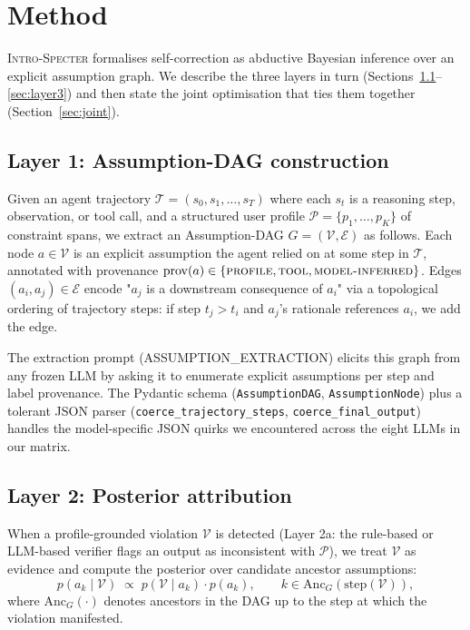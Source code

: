 \section{Method}
\label{sec:method}

\textsc{Intro-Specter} formalises self-correction as abductive Bayesian
inference over an explicit assumption graph. We describe the three
layers in turn (Sections~\ref{sec:layer1}--\ref{sec:layer3}) and then
state the joint optimisation that ties them together
(Section~\ref{sec:joint}).

\subsection{Layer 1: Assumption-DAG construction}
\label{sec:layer1}

Given an agent trajectory $\mathcal{T} = (s_0, s_1, \dots, s_T)$ where
each $s_t$ is a reasoning step, observation, or tool call, and a
structured user profile $\mathcal{P} = \{p_1, \dots, p_K\}$ of
constraint spans, we extract an Assumption-DAG
$G = (\mathcal{V}, \mathcal{E})$ as follows. Each node $a \in \mathcal{V}$
is an explicit assumption the agent relied on at some step in
$\mathcal{T}$, annotated with provenance
$\mathrm{prov}(a) \in \{\textsc{profile}, \textsc{tool}, \textsc{model-inferred}\}$.
Edges $(a_i, a_j) \in \mathcal{E}$ encode "$a_j$ is a downstream
consequence of $a_i$" via a topological ordering of trajectory steps:
if step $t_j > t_i$ and $a_j$'s rationale references $a_i$, we add the
edge.

The extraction prompt (\textsc{ASSUMPTION\_EXTRACTION}) elicits this
graph from any frozen LLM by asking it to enumerate explicit
assumptions per step and label provenance. The Pydantic schema
(\texttt{AssumptionDAG}, \texttt{AssumptionNode}) plus a tolerant JSON
parser (\texttt{coerce\_trajectory\_steps}, \texttt{coerce\_final\_output})
handles the model-specific JSON quirks we encountered across the eight
LLMs in our matrix.

\subsection{Layer 2: Posterior attribution}
\label{sec:layer2}

When a profile-grounded violation $\mathcal{V}$ is detected (Layer 2a:
the rule-based or LLM-based verifier flags an output as inconsistent
with $\mathcal{P}$), we treat $\mathcal{V}$ as evidence and compute the
posterior over candidate ancestor assumptions:
\begin{equation}
p(a_k \mid \mathcal{V}) \;\propto\; p(\mathcal{V} \mid a_k) \cdot p(a_k),
\qquad k \in \mathrm{Anc}_G(\mathrm{step}(\mathcal{V})),
\end{equation}
where $\mathrm{Anc}_G(\cdot)$ denotes ancestors in the DAG up to the
step at which the violation manifested.


